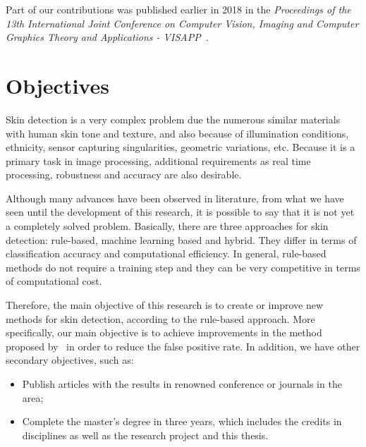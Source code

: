 Part of our contributions was published earlier in 2018 in the \emph{Proceedings of the 13th International Joint Conference on Computer Vision, Imaging and Computer Graphics Theory and Applications - VISAPP}~\citep{faria:18}.


\section{Objectives}
\label{sec:objectives}

Skin detection is a very complex problem due the numerous similar materials with human skin tone and texture, and also because of illumination conditions, ethnicity, sensor capturing singularities, geometric variations, etc. Because it is a primary task in image processing, additional requirements as real time processing, robustness and accuracy are also desirable.

Although many advances have been observed in literature, from what we have seen until the development of this research, it is possible to say that it is not yet a completely solved problem. Basically, there are three approaches for skin detection: rule-based, machine learning based and hybrid. They differ in terms of classification accuracy and computational efficiency. In general, rule-based methods do not require a training step and they can be very competitive in terms of computational cost.

Therefore, the main objective of this research is to create or improve new methods for skin detection, according to the rule-based approach. More specifically, our main objective is to achieve improvements in the method proposed by~\citet{brancati:17} in order to reduce the false positive rate. In addition, we have other secondary objectives, such as:
\begin{itemize}
    \item Publish articles with the results in renowned conference or journals in the area;
    \item Complete the master's degree in three years, which includes the credits in disciplines as well as the research project and this thesis.
\end{itemize}



